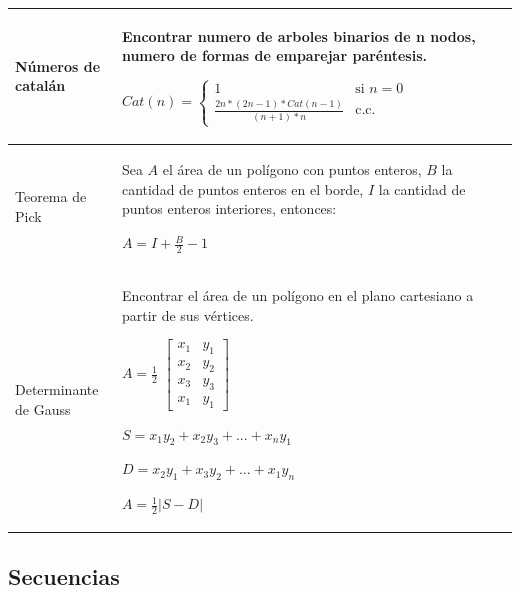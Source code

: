 \documentclass[10pt,landscape,twocolumn,a4paper,notitlepage]{article}
\begin{document}
\begin{center}
{\begin{supertabular}{|p{2.2cm}|p{8.2cm}|}
					Números de catalán & Encontrar numero de arboles binarios de n nodos, numero 
					de formas de emparejar paréntesis.
					
					{\large
					$Cat(n) = 	
					\begin{cases}
						1 & \text{si $n = 0$}\\
						\frac{2n*(2n-1) * Cat(n-1)}{(n+1)*n} & \text{c.c.}
					\end{cases}
					$}
					\\ \hline
					
					Teorema de Pick & Sea $A$ el área de un polígono con puntos enteros, $B$ la cantidad de puntos 
					enteros en el borde, $I$ la cantidad de puntos enteros interiores, entonces:
					
					$A = I + \frac{B}{2} - 1$
					\vspace{1mm}
					\\ \hline
					
					Determinante de Gauss & Encontrar el área de un polígono en el plano cartesiano a partir de 
					sus vértices.
					
					{\large$A = \frac{1}{2} $}
					{\large $ \begin{bmatrix}
						x_{1} & y_{1} \\ 
						x_{2} & y_{2} \\ 
						x_{3} & y_{3} \\ 
						x_{1} & y_{1} 
					\end{bmatrix}$ }
					
					\vspace{1mm}
					{\large $S = x_{1}y_{2} + x_{2}y_{3} +...+ x_{n}y_{1}$}
					
					\vspace{1mm}
					{\large $D = x_{2}y_{1} + x_{3}y_{2} +...+ x_{1}y_{n}$} 
					
					\vspace{1mm}
					{\large $A = \frac{1}{2} |S - D|$}
					\\ \hline
					
				\end{supertabular}
				}
			\end{center}

			
		\subsection{Secuencias}
		
\end{document}
